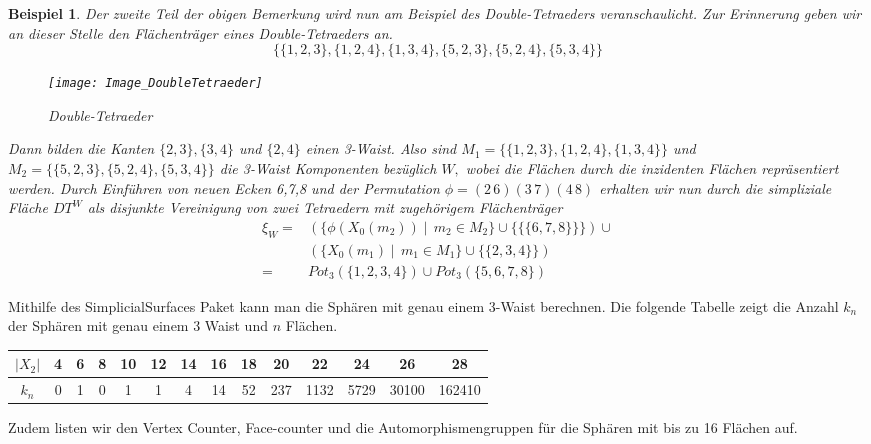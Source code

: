 \documentclass[12pt,titlepage,twoside,cleardoublepage]{article}
\theoremstyle{nummermitklammern}
\newtheorem{bsp}[temp]{Beispiel}
\newtheorem{bsp}[zahl]{Beispiel}
\numberwithin{equation}{section}
\begin{document}
\begin{bsp}
Der zweite Teil der obigen Bemerkung wird nun am Beispiel des Double-Tetraeders veranschaulicht.
Zur Erinnerung geben wir an dieser Stelle den Flächenträger eines Double-Tetraeders an.
\[
\{\{1,2,3\},\{1,2,4\},\{1,3,4\},\{5,2,3\},\{5,2,4\},\{5,3,4\}\}
\]
\begin{figure}[H]
\begin{center}
\texttt{[image: Image\_DoubleTetraeder]}
\end{center}
\caption{Double-Tetraeder}
\end{figure}
Dann bilden die Kanten $\{2,3\},\{3,4\}$ und $\{2,4\}$ einen 3-Waist. Also sind $M_1=\{\{1,2,3\},\{1,2,4\},\{1,3,4\}\}$ und $M_2=\{\{5,2,3\},\{5,2,4\},\{5,3,4\}\}$ die 3-Waist Komponenten bezüglich $W,$ wobei die Flächen durch die inzidenten Flächen repräsentiert werden. Durch Einführen von neuen Ecken 6,7,8 und der Permutation $\phi=(2\, 6)(3\, 7)(4\,8)$ erhalten wir nun durch die simpliziale Fläche $DT^W$ als disjunkte Vereinigung von zwei Tetraedern mit zugehörigem Flächenträger
\begin{align*}
\xi_W=&(\{\phi(X_0(m_2))\mid \, m_2\in M_2\}\cup \{\{\{6,7,8\}\}\}) \cup \\
&(\{X_0(m_1)\mid \, m_1\in M_1\}\cup \{\{2,3,4\}\})\\
=&Pot_3(\{1,2,3,4\})\cup Pot_3(\{5,6,7,8\})
\end{align*}
\end{bsp}
Mithilfe des SimplicialSurfaces Paket kann man die Sphären mit genau einem 3-Waist berechnen. Die folgende Tabelle zeigt die Anzahl $k_n$ der Sphären mit genau einem 3 Waist und $n$ Flächen. \\
\begin{tabular}[h]{|c|c|c|c|c|c|c|c|c|c|c|c|c|c|}
\hline
\textbf{$\vert X_2\vert$}& \textbf{4} &  \textbf{6}& \textbf{8} & \textbf{10} & \textbf{12} & \textbf{14}&\textbf{16}&\textbf{18}&\textbf{20}&\textbf{22}&\textbf{24}&\textbf{26}&\textbf{28}\\
\hline
 \textbf{$k_n$}  &0& 1& 0& 1 &1& 4& 14& 52 &237& 1132& 5729& 30100& 162410\\
 \hline
\end{tabular}

Zudem listen wir den Vertex Counter, Face-counter und die Automorphismengruppen für die Sphären mit bis zu 16 Flächen auf.
\end{document}
